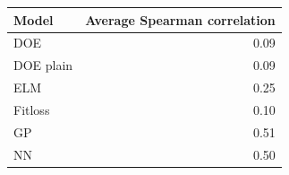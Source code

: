 \begin{tabular}{lr}
\toprule
Model & Average Spearman correlation \\
\midrule
DOE & 0.09 \\
DOE plain & 0.09 \\
ELM & 0.25 \\
Fitloss & 0.10 \\
GP & 0.51 \\
NN & 0.50 \\
\bottomrule
\end{tabular}
